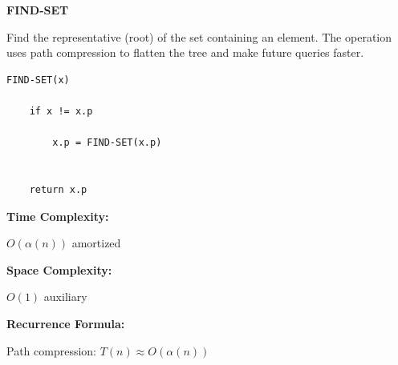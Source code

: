 \documentclass[a4paper,12pt]{article}
\begin{document}
\begin{tcolorbox}[
    colback=gray!30,
    colframe=black,
    boxrule=1pt,
    arc=0mm
]

\begin{tcolorbox}[
    colback=gray!10,
    colframe=black,
    arc=0mm
]
\centering
{\Huge\bfseries FIND-SET}
\end{tcolorbox}


\begin{tcolorbox}[
    colback=gray!10,
    colframe=black,
    arc=0mm
]
\small
Find the representative (root) of the set containing an element.
The operation uses path compression to flatten the tree and make future
queries faster.
\end{tcolorbox}


\begin{tcolorbox}[
    colback=black!5,
    colframe=black,
    arc=0mm,
    title=Pseudo-code
]
\tiny
\begin{lstlisting}
FIND-SET(x)

    if x != x.p

        x.p = FIND-SET(x.p)


    return x.p
\end{lstlisting}
\end{tcolorbox}


\begin{tcolorbox}[
    colback=cyan!20,
    colframe=black,
    arc=0mm
]
\small
\textbf{Time Complexity:}

$O(\alpha(n))$ amortized
\end{tcolorbox}


\begin{tcolorbox}[
    colback=violet!20,
    colframe=black,
    arc=0mm
]
\small
\textbf{Space Complexity:}

$O(1)$ auxiliary
\end{tcolorbox}


\begin{tcolorbox}[
    colback=pink!20,
    colframe=black,
    arc=0mm
]
\small
\textbf{Recurrence Formula:}

Path compression:
$T(n) \approx O(\alpha(n))$
\end{tcolorbox}

\end{tcolorbox}
\end{document}
